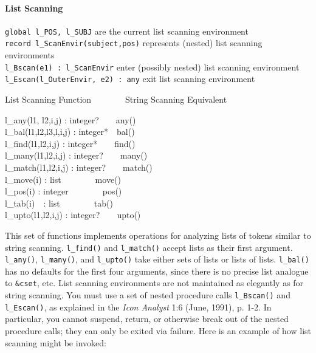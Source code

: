\paragraph{List Scanning}
\texttt{global l\_POS, l\_SUBJ} are the current list scanning
environment\\
\texttt{record l\_ScanEnvir(subject,pos)} represents (nested) list
scanning environments\\
\texttt{l\_Bscan(e1) : l\_ScanEnvir} enter (possibly nested) list
scanning environment\\
\texttt{l\_Escan(l\_OuterEnvir, e2) : any} exit list scanning
environment

List Scanning Function\ \ \ \ \ \ \ \ String Scanning Equivalent

l\_any(l1, l2,i,j) : integer?\ \ \ \ any()\\
l\_bal(l1,l2,l3,l,i,j) : integer*\ \ bal()\\
l\_find(l1,l2,i,j) : integer*\ \ \ \ find()\\
l\_many(l1,l2,i,j) : integer?\ \ \ \ many()\\
l\_match(l1,l2,i,j) : integer?\ \ \ \ match()\\
l\_move(i) : list\ \ \ \ \ \ \ \ move()\\
l\_pos(i) : integer\ \ \ \ \ \ \ \ pos()\\
l\_tab(i)\ \ : list\ \ \ \ \ \ \ \ tab()\\
l\_upto(l1,l2,i,j) : integer?\ \ \ \ upto()

This set of functions implements operations for analyzing lists of
tokens similar to string scanning. \texttt{l\_find()} and
\texttt{l\_match()} accept lists as their first argument.
\texttt{l\_any()}, \texttt{l\_many()}, and \texttt{l\_upto()} take
either sets of lists or lists of lists. \texttt{l\_bal()} has no
defaults for the first four arguments, since there is no precise list
analogue to \texttt{\&cset}, etc. List scanning environments are not
maintained as elegantly as for string scanning. You must use a set of
nested procedure calls \texttt{l\_Bscan()} and \texttt{l\_Escan()}, as
explained in the \textit{Icon Analyst} 1:6 (June, 1991), p. 1-2. In
particular, you cannot suspend, return, or otherwise break out of the
nested procedure calls; they can only be exited via failure. Here is an
example of how list scanning might be invoked:


